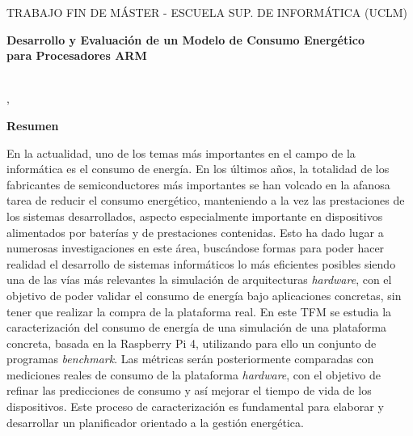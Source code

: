\pagestyle{plain}	%

%
% 
%

\makeatletter
\begin{center} %
   {\textsc{TRABAJO FIN DE MÁSTER - ESCUELA SUP. DE INFORMÁTICA (UCLM)}\par} %
   \vspace{1cm} %
   {\textbf{\Large Desarrollo y Evaluación de un Modelo de Consumo Energético\\para Procesadores ARM}\par}  %
   \vspace{0.4cm} %
   {\@autor \\ \@cityTF,{} \@mesTF{} \@yearTF\par} 
   \vspace{0.9cm} %
   {\textbf{\large\textsf{Resumen}}\par} %
\end{center}   
\makeatother %

En la actualidad, uno de los temas más importantes en el campo de la informática es el consumo de energía. En los últimos años, la totalidad de los fabricantes de semiconductores más importantes se han volcado en la afanosa tarea de reducir el consumo energético, manteniendo a la vez las prestaciones de los sistemas desarrollados, aspecto especialmente importante en dispositivos alimentados por baterías y de prestaciones contenidas. Esto ha dado lugar a numerosas investigaciones en este área, buscándose formas para poder hacer realidad el desarrollo de sistemas informáticos lo más eficientes posibles siendo una de las vías más relevantes la simulación de arquitecturas \textit{hardware}, con el objetivo de poder validar el consumo de energía bajo aplicaciones concretas, sin tener que realizar la compra de la plataforma real. En este TFM se estudia la caracterización del consumo de energía de una simulación de una plataforma concreta, basada en la Raspberry Pi 4, utilizando para ello un conjunto de programas \textit{benchmark}. Las métricas serán posteriormente comparadas con mediciones reales de consumo de la plataforma \textit{hardware}, con el objetivo de refinar las predicciones de consumo y así mejorar el tiempo de vida de los dispositivos. Este proceso de caracterización es fundamental para elaborar y desarrollar un planificador orientado a la gestión energética.


